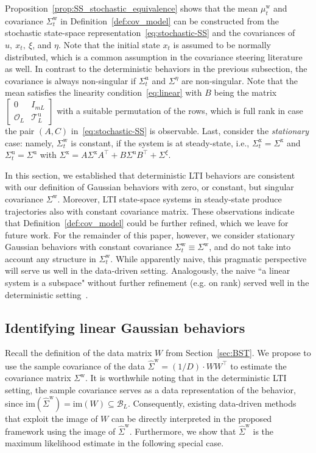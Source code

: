 \documentclass[letterpaper, 10 pt, conference]{ieeeconf}
\def\mw{\mu^\mathrm{w}_t}
\def\Sw{\Sigma^\mathrm{w}}
\def\Swh{\hat{\Sigma}^\mathrm{w}}
\begin{document}
Proposition~\ref{prop:SS_stochastic_equivalence} shows that the mean $\mw$ and covariance $\Sw_t$ in Definition~\ref{def:cov_model} can be constructed from the stochastic state-space representation~\eqref{eq:stochastic-SS} and the covariances of $u,~x_t,~\xi$, and $\eta$.
Note that the initial state $x_t$ is assumed to be normally distributed, which is a common assumption in the covariance steering literature~\cite{chen2015optimal,liu2024optimal,pilipovsky2023data,aolaritei2022distributional} as well.
In contrast to the deterministic behaviors in the previous subsection, the covariance is always non-singular if $\Sigma^\mathrm{u}_t$ and $\Sigma^\eta$ are non-singular.
Note that the mean satisfies the linearity condition~\eqref{eq:linear} with $B$ being the matrix $\begin{bmatrix}
    0 & I_{mL} \\ \mathcal{O}_L & \mathcal{T}_L^\mathrm{u}
\end{bmatrix}$ with a suitable permutation of the rows, which is full rank in case the pair $(A,C)$ in~\eqref{eq:stochastic-SS} is observable.
Last, consider the \textit{stationary} case: namely, $\Sw_t$ is constant, if the system is at steady-state, i.e., $\Sigma^\mathrm{x}_t = \Sigma^\mathrm{x}$ and $\Sigma^\mathrm{u}_t = \Sigma^\mathrm{u}$ with $\Sigma^\mathrm{x} = A \Sigma^\mathrm{x} A^\top + B \Sigma^\mathrm{u}B^\top + \Sigma^\xi$.


In this section, we established that deterministic \gls{LTI} behaviors are consistent with our definition of Gaussian behaviors with zero, or constant, but singular covariance $\Sw$. 
Moreover, \gls{LTI} state-space systems in steady-state produce trajectories also with constant covariance matrix.
These observations indicate that Definition~\ref{def:cov_model} could be further refined, which we leave for future work. 
For the remainder of this paper, however, we consider stationary Gaussian behaviors with constant covariance $\Sw_t \equiv \Sw$, and do not take into account any structure in $\Sw_t$.
While apparently naive, this pragmatic perspective will serve us well in the data-driven setting.
Analogously, the naive ``a linear system is a subspace" without further refinement (e.g. on rank) served well in the deterministic setting~\cite{dorfler2022bridging,markovsky2022data,markovsky2021behavioral,huang2021quadratic}.


\subsection{Identifying linear Gaussian behaviors} \label{sec:sysID}
Recall the definition of the data matrix $W$ from Section~\ref{sec:BST}.
We propose to use the sample covariance of the data $\Swh = (1/D)\cdot WW^\top$ to estimate the covariance matrix $\Sw$.
It is worthwhile noting that in the deterministic \gls{LTI} setting, the sample covariance serves as a data representation of the behavior, since $\mathrm{im}(\Swh) = \mathrm{im}(W) \subseteq \mathcal{B}_L$.
Consequently, existing data-driven methods that exploit the image of $W$ can be directly interpreted in the proposed framework using the image of $\Swh$.
Furthermore, we show that $\Swh$ is the maximum likelihood estimate in the following special case.
\end{document}
